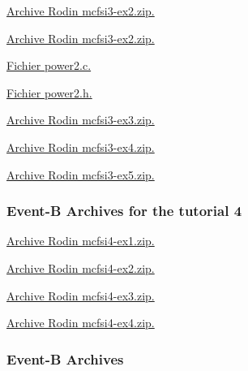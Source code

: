 \documentclass[ 12pt]{article}
\begin{document}
\href{http://mery54.github.io/teaching/mosos/models/mcfsi3-ex2.zip}{Archive 
  Rodin  mcfsi3-ex2.zip.}

\href{http://mery54.github.io/teaching/mosos/models/mcfsi3-ex2-plugin.zip}{Archive 
  Rodin  mcfsi3-ex2.zip.}



\href{http://mery54.github.io/teaching/mosos/codes/power2.c}{Fichier 
  power2.c.}

\href{http://mery54.github.io/teaching/mosos/codes/power2.h}{Fichier 
  power2.h.}


\href{http://mery54.github.io/teaching/mosos/models/mcfsi3-ex3.zip}{Archive 
  Rodin  mcfsi3-ex3.zip.}



\href{http://mery54.github.io/teaching/mosos/models/mcfsi3-ex4.zip}{Archive 
  Rodin  mcfsi3-ex4.zip.}



\href{http://mery54.github.io/teaching/mosos/models/mcfsi3-ex5.zip}{Archive 
  Rodin  mcfsi3-ex5.zip.}



 \subsubsection{Event-B Archives for   the tutorial 4}
\label{sec:event-b-archives}





\href{http://mery54.github.io/teaching/mosos/models/mcfsi4-ex1.zip}{Archive 
  Rodin  mcfsi4-ex1.zip.}


\href{http://mery54.github.io/teaching/mosos/models/mcfsi4-ex2.zip}{Archive 
  Rodin  mcfsi4-ex2.zip.}





\href{http://mery54.github.io/teaching/mosos/models/mcfsi4-ex3.zip}{Archive 
  Rodin  mcfsi4-ex3.zip.}




\href{http://mery54.github.io/teaching/mosos/models/mcfsi4-ex4.zip}{Archive 
  Rodin  mcfsi4-ex4.zip.}





 \subsubsection{Event-B Archives}
\label{sec:event-b-archives}
\end{document}
